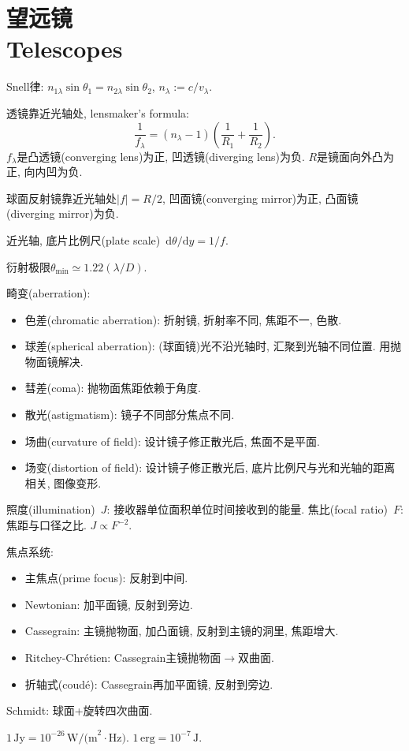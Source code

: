 \chapter{望远镜\\Telescopes}

Snell律: $n_{1\lambda}\sin\theta_1=n_{2\lambda}\sin\theta_2$, $n_\lambda:=c/v_\lambda$.

透镜靠近光轴处, lensmaker's formula:
\begin{equation*}
    \frac{1}{f_\lambda}=(n_\lambda-1)\left(\frac{1}{R_1}+\frac{1}{R_2}\right).
\end{equation*}
$f_\lambda$是凸透镜(converging lens)为正, 凹透镜(diverging lens)为负. $R$是镜面向外凸为正, 向内凹为负.

球面反射镜靠近光轴处$\left\lvert f\right\rvert=R/2$, 凹面镜(converging mirror)为正, 凸面镜(diverging mirror)为负.

近光轴, 底片比例尺(plate scale)~$\mathrm{d}\theta/\mathrm{d}y=1/f$.

衍射极限$\theta_\text{min}\simeq1.22(\lambda/D)$.

畸变(aberration):
\begin{itemize}
    \item 色差(chromatic aberration): 折射镜, 折射率不同, 焦距不一, 色散.
    \item 球差(spherical aberration): (球面镜)光不沿光轴时, 汇聚到光轴不同位置. 用抛物面镜解决.
    \item 彗差(coma): 抛物面焦距依赖于角度.
    \item 散光(astigmatism): 镜子不同部分焦点不同.
    \item 场曲(curvature of field): 设计镜子修正散光后, 焦面不是平面.
    \item 场变(distortion of field): 设计镜子修正散光后, 底片比例尺与光和光轴的距离相关, 图像变形.
\end{itemize}

照度(illumination)~$J$: 接收器单位面积单位时间接收到的能量. 焦比(focal ratio)~$F$: 焦距与口径之比. $J\propto F^{-2}$.

焦点系统:
\begin{itemize}
    \item 主焦点(prime focus): 反射到中间.
    \item Newtonian: 加平面镜, 反射到旁边.
    \item Cassegrain: 主镜抛物面, 加凸面镜, 反射到主镜的洞里, 焦距增大.
    \item Ritchey-Chr\'etien: Cassegrain主镜抛物面$\to$双曲面.
    \item 折轴式(coud\'e): Cassegrain再加平面镜, 反射到旁边.
\end{itemize}

Schmidt: 球面+旋转四次曲面.

$1\,\text{Jy}=10^{-26}\,\text{W/(m}^2\!\cdot\text{Hz)}$. $1\,\text{erg}=10^{-7}\,\text{J}$.
